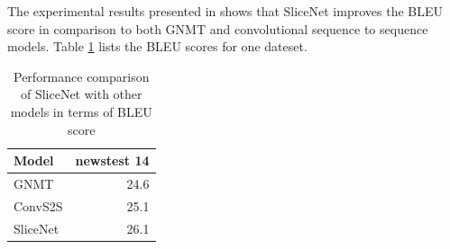 \documentclass[a4paper]{article}
\begin{document}
The experimental results presented in \cite{DBLP:journals/corr/KaiserGC17} shows
that  SliceNet  improves  the  BLEU  score  in  comparison  to  both   GNMT  and
convolutional sequence to sequence models. Table \ref{tab:snbleu} lists the BLEU
scores for one dateset.


\begin{table}
  \center
  \begin{tabular}{lr}
  \hline
    Model & newstest 14 \\
  \hline
    GNMT & 24.6 \\
    ConvS2S & 25.1 \\
    SliceNet & 26.1 \\
  \hline
  \end{tabular}
  \caption{Performance comparison of SliceNet with other models in terms of BLEU
  score}
  \label{tab:snbleu}
\end{table}




\end{document}
